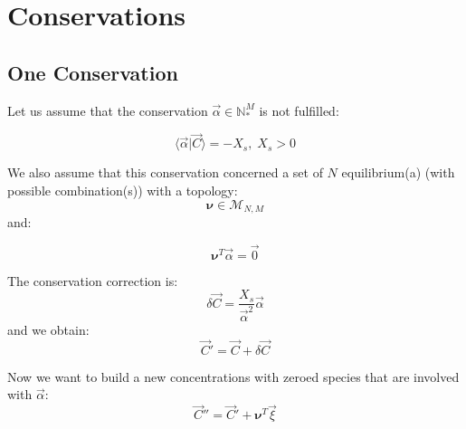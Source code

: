 \documentclass[aps,12pt]{revtex4}
\begin{document}
\section{Conservations}

\subsection{One Conservation}

Let us assume that the conservation $\vec \alpha \in \mathbb{N}_\ast^M$ is not fulfilled:

\begin{equation}
	\langle \vec \alpha \vert \vec C \rangle = - X_s, \; X_s > 0
\end{equation}

We also assume that this conservation concerned a set of $N$ equilibrium(a) (with possible combination(s))
with a topology:
\begin{equation}
	\bm \nu \in \mathcal{M}_{N,M}  \end{equation}
and:

\begin{equation}
	 \bm \nu ^T \vec \alpha = \vec 0
\end{equation}

The conservation correction is:
\begin{equation}
	\delta \vec C =  \dfrac{X_s}{\vec\alpha^2} \vec \alpha
\end{equation}
and we obtain:
\begin{equation}
	\vec C ' = \vec C + \delta \vec{C}
\end{equation}
	
Now we want to build a new concentrations with zeroed species
that are involved with $\vec \alpha$:
\begin{equation}
	\vec C '' = \vec C' + \bm\nu^T \vec \xi 
\end{equation}

 
\end{document}
